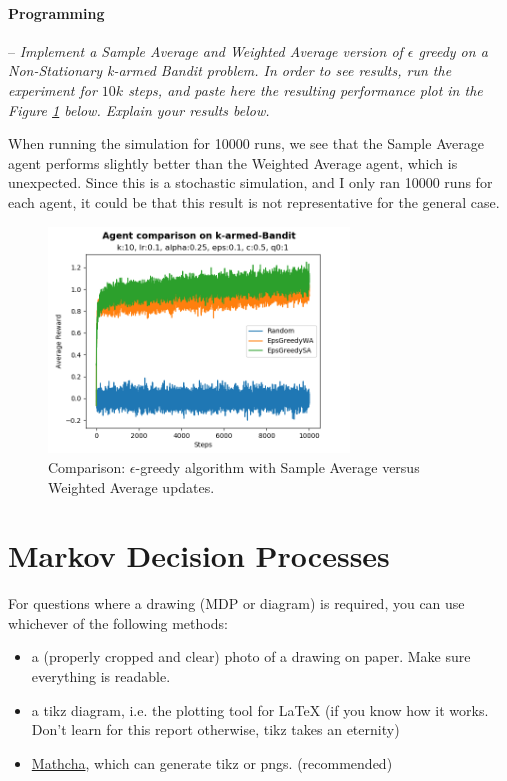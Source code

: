 \documentclass[a4paper]{article}
\newcommand{\programming}[1]{
\paragraph{Programming} -- \textit{#1}

}
\begin{document}
		\programming{Implement a Sample Average and Weighted Average version of $\epsilon$ greedy on a Non-Stationary k-armed Bandit problem. 
				In order to see results, run the experiment for $10k$ steps, and paste here the resulting performance plot in the Figure \ref{fig:sa_vs_wa} below. 
				Explain your results below.}
			When running the simulation for 10000 runs, we see that the Sample Average agent performs slightly better than the Weighted Average agent, which is unexpected.
			Since this is a stochastic simulation, and I only ran 10000 runs for each agent, it could be that this result is not representative for the general case.

			\begin{figure}[H]
				\centering
				\includegraphics[width=8cm]{plots/agent_comparison_perf}
				\caption{Comparison: $\epsilon$-greedy algorithm with Sample Average versus Weighted Average updates.}
				\label{fig:sa_vs_wa}
			\end{figure}{}


	\section{Markov Decision Processes}
		For questions where a drawing (MDP or diagram) is required, you can use whichever of the following methods:
		\begin{itemize}
			\item a (properly cropped and clear) photo of a drawing on paper. 
				Make sure everything is readable.
			\item a tikz diagram, i.e. the plotting tool for LaTeX (if you know how it works. Don't learn for this report otherwise, tikz takes an eternity)
			\item \href{www.mathcha.io}{Mathcha}, which can generate tikz or pngs. (recommended)
		\end{itemize}{}
\end{document}
